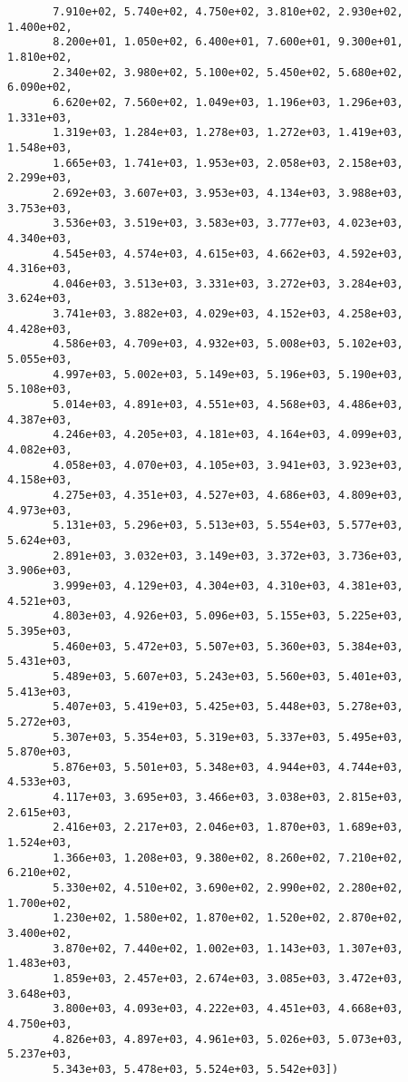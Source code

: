 \documentclass[11pt]{article}
\begin{document}
\begin{verbatim}
       7.910e+02, 5.740e+02, 4.750e+02, 3.810e+02, 2.930e+02, 1.400e+02,
       8.200e+01, 1.050e+02, 6.400e+01, 7.600e+01, 9.300e+01, 1.810e+02,
       2.340e+02, 3.980e+02, 5.100e+02, 5.450e+02, 5.680e+02, 6.090e+02,
       6.620e+02, 7.560e+02, 1.049e+03, 1.196e+03, 1.296e+03, 1.331e+03,
       1.319e+03, 1.284e+03, 1.278e+03, 1.272e+03, 1.419e+03, 1.548e+03,
       1.665e+03, 1.741e+03, 1.953e+03, 2.058e+03, 2.158e+03, 2.299e+03,
       2.692e+03, 3.607e+03, 3.953e+03, 4.134e+03, 3.988e+03, 3.753e+03,
       3.536e+03, 3.519e+03, 3.583e+03, 3.777e+03, 4.023e+03, 4.340e+03,
       4.545e+03, 4.574e+03, 4.615e+03, 4.662e+03, 4.592e+03, 4.316e+03,
       4.046e+03, 3.513e+03, 3.331e+03, 3.272e+03, 3.284e+03, 3.624e+03,
       3.741e+03, 3.882e+03, 4.029e+03, 4.152e+03, 4.258e+03, 4.428e+03,
       4.586e+03, 4.709e+03, 4.932e+03, 5.008e+03, 5.102e+03, 5.055e+03,
       4.997e+03, 5.002e+03, 5.149e+03, 5.196e+03, 5.190e+03, 5.108e+03,
       5.014e+03, 4.891e+03, 4.551e+03, 4.568e+03, 4.486e+03, 4.387e+03,
       4.246e+03, 4.205e+03, 4.181e+03, 4.164e+03, 4.099e+03, 4.082e+03,
       4.058e+03, 4.070e+03, 4.105e+03, 3.941e+03, 3.923e+03, 4.158e+03,
       4.275e+03, 4.351e+03, 4.527e+03, 4.686e+03, 4.809e+03, 4.973e+03,
       5.131e+03, 5.296e+03, 5.513e+03, 5.554e+03, 5.577e+03, 5.624e+03,
       2.891e+03, 3.032e+03, 3.149e+03, 3.372e+03, 3.736e+03, 3.906e+03,
       3.999e+03, 4.129e+03, 4.304e+03, 4.310e+03, 4.381e+03, 4.521e+03,
       4.803e+03, 4.926e+03, 5.096e+03, 5.155e+03, 5.225e+03, 5.395e+03,
       5.460e+03, 5.472e+03, 5.507e+03, 5.360e+03, 5.384e+03, 5.431e+03,
       5.489e+03, 5.607e+03, 5.243e+03, 5.560e+03, 5.401e+03, 5.413e+03,
       5.407e+03, 5.419e+03, 5.425e+03, 5.448e+03, 5.278e+03, 5.272e+03,
       5.307e+03, 5.354e+03, 5.319e+03, 5.337e+03, 5.495e+03, 5.870e+03,
       5.876e+03, 5.501e+03, 5.348e+03, 4.944e+03, 4.744e+03, 4.533e+03,
       4.117e+03, 3.695e+03, 3.466e+03, 3.038e+03, 2.815e+03, 2.615e+03,
       2.416e+03, 2.217e+03, 2.046e+03, 1.870e+03, 1.689e+03, 1.524e+03,
       1.366e+03, 1.208e+03, 9.380e+02, 8.260e+02, 7.210e+02, 6.210e+02,
       5.330e+02, 4.510e+02, 3.690e+02, 2.990e+02, 2.280e+02, 1.700e+02,
       1.230e+02, 1.580e+02, 1.870e+02, 1.520e+02, 2.870e+02, 3.400e+02,
       3.870e+02, 7.440e+02, 1.002e+03, 1.143e+03, 1.307e+03, 1.483e+03,
       1.859e+03, 2.457e+03, 2.674e+03, 3.085e+03, 3.472e+03, 3.648e+03,
       3.800e+03, 4.093e+03, 4.222e+03, 4.451e+03, 4.668e+03, 4.750e+03,
       4.826e+03, 4.897e+03, 4.961e+03, 5.026e+03, 5.073e+03, 5.237e+03,
       5.343e+03, 5.478e+03, 5.524e+03, 5.542e+03])
    \end{verbatim}
\end{document}
